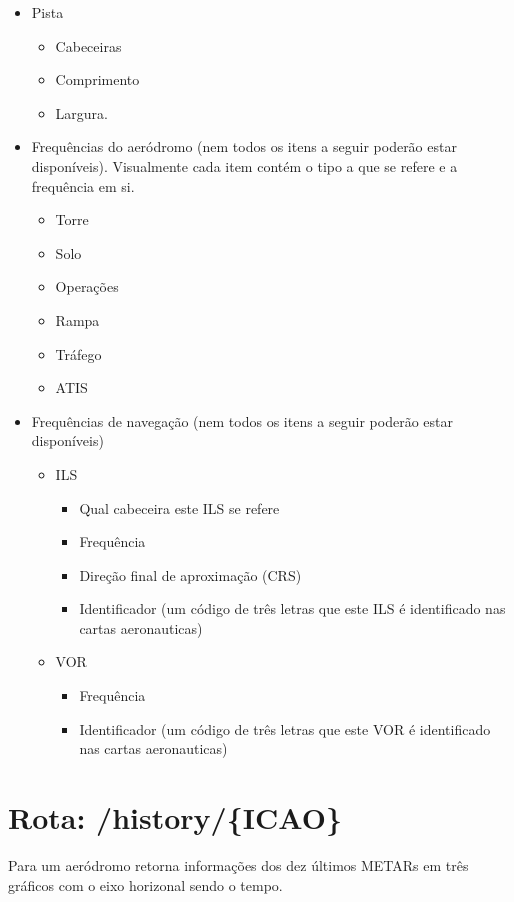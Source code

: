 \begin{itemize}
    \item Pista
        \begin {itemize}
        \item Cabeceiras
        \item Comprimento
        \item Largura.
        \end {itemize}
    \item Frequências do aeródromo (nem todos os itens a seguir poderão estar disponíveis). Visualmente cada item contém o tipo a que se refere e a frequência em si.
    \begin{itemize}
        \item Torre
        \item Solo
        \item Operações
        \item Rampa
        \item Tráfego
        \item ATIS
    \end{itemize}
    \item Frequências de navegação (nem todos os itens a seguir poderão estar disponíveis)
    \begin{itemize}
        \item ILS
            \begin{itemize}
                \item Qual cabeceira este ILS se refere
                \item Frequência
                \item Direção final de aproximação (CRS)
                \item Identificador (um código de três letras que este ILS é identificado nas cartas aeronauticas)
            \end{itemize}
        \item VOR
            \begin{itemize}
                \item Frequência
                \item Identificador (um código de três letras que este VOR é identificado nas cartas aeronauticas)
            \end{itemize}
    \end{itemize}
\end{itemize}

\section{Rota: /history/\{ICAO\}}
Para um aeródromo retorna informações dos dez últimos METARs em três
gráficos com o eixo horizonal sendo o tempo.

